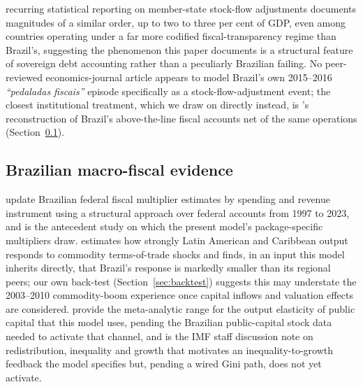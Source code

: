 \documentclass[11pt,a4paper]{article}
\begin{document}
recurring statistical reporting on member-state stock-flow adjustments \citep{eurostat2024sfa} documents magnitudes of a similar order, up to two to three per cent of GDP, even among countries operating under a far more codified fiscal-transparency regime than Brazil's, suggesting the phenomenon this paper documents is a structural feature of sovereign debt accounting rather than a peculiarly Brazilian failing. No peer-reviewed economics-journal article appears to model Brazil's own 2015--2016 \emph{``pedaladas fiscais''} episode specifically as a stock-flow-adjustment event; the closest institutional treatment, which we draw on directly instead, is \citet{gobettiorair2017}'s reconstruction of Brazil's above-the-line fiscal accounts net of the same operations (Section~\ref{sec:lit-brazil}).

\subsection{Brazilian macro-fiscal evidence}
\label{sec:lit-brazil}

\citet{sanches2026} update Brazilian federal fiscal multiplier estimates by spending and revenue instrument using a structural approach over federal accounts from 1997 to 2023, and \citet{carvalhosanches2019} is the antecedent study on which the present model's package-specific multipliers draw. \citet{gruss2014} estimates how strongly Latin American and Caribbean output responds to commodity terms-of-trade shocks and finds, in an input this model inherits directly, that Brazil's response is markedly smaller than its regional peers; our own back-test (Section~\ref{sec:backtest}) suggests this may understate the 2003--2010 commodity-boom experience once capital inflows and valuation effects are considered. \citet{bomligthart2014} provide the meta-analytic range for the output elasticity of public capital that this model uses, pending the Brazilian public-capital stock data needed to activate that channel, and \citet{ostrybergtsangarides2014} is the IMF staff discussion note on redistribution, inequality and growth that motivates an inequality-to-growth feedback the model specifies but, pending a wired Gini path, does not yet activate.
\end{document}
